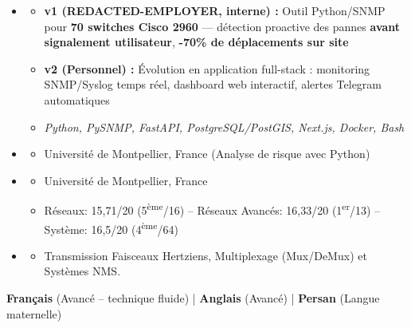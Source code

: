 \documentclass[11pt,a4paper]{article}
\renewcommand{\itemspace}{\vspace{0.15em}}
\begin{document}
\begin{itemize}[leftmargin=1em, label={}]
    \item
    \begin{itemize}[leftmargin=1.5em, label=$\circ$, nosep]
        \item \textbf{v1 (REDACTED-EMPLOYER, interne) :} Outil Python/SNMP pour \textbf{70 switches Cisco 2960} — détection proactive des pannes \textbf{avant signalement utilisateur}, \textbf{-70\% de déplacements sur site}
        \item \textbf{v2 (Personnel) :} Évolution en application full-stack : monitoring SNMP/Syslog temps réel, dashboard web interactif, alertes Telegram automatiques
        \item \emph{Python, PySNMP, FastAPI, PostgreSQL/PostGIS, Next.js, Docker, Bash}
    \end{itemize}
\end{itemize}

\begin{itemize}[leftmargin=1em, label={}]
    \item
    \begin{itemize}[leftmargin=1.5em, label=$\circ$, nosep]
        \item Université de Montpellier, France (Analyse de risque avec Python)
    \end{itemize}
    \itemspace
    \item
    \begin{itemize}[leftmargin=1.5em, label=$\circ$, nosep]
        \item Université de Montpellier, France
        \item Réseaux: 15,71/20 (5\textsuperscript{ème}/16) -- Réseaux Avancés: 16,33/20 (1\textsuperscript{er}/13) -- Système: 16,5/20 (4\textsuperscript{ème}/64)
    \end{itemize}
    \itemspace
    \item
    \begin{itemize}[leftmargin=1.5em, label=$\circ$, nosep]
        \item Transmission Faisceaux Hertziens, Multiplexage (Mux/DeMux) et Systèmes NMS.
    \end{itemize}
\end{itemize}

\noindent
\textbf{Français} (Avancé -- technique fluide) | \textbf{Anglais} (Avancé) | \textbf{Persan} (Langue maternelle)
\end{document}
